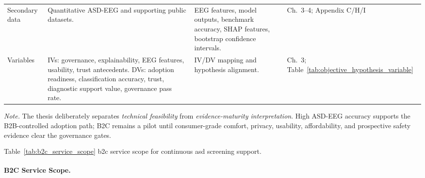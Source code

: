 {\begin{xltabular}{\textwidth}{@{} >{\raggedright\arraybackslash}p{2.0cm} p{6.1cm} p{4.4cm} >{\raggedright\arraybackslash}p{2.0cm} @{}}
\addlinespace
Secondary data & Quantitative ASD-EEG and supporting public datasets. & EEG features, model outputs, benchmark accuracy, SHAP features, bootstrap confidence intervals. & Ch.~3--4; Appendix C/H/I \\
\addlinespace
Variables & IVs: governance, explainability, EEG features, usability, trust antecedents. DVs: adoption readiness, classification accuracy, trust, diagnostic support value, governance pass rate. & IV/DV mapping and hypothesis alignment. & Ch.~3; Table~\ref{tab:objective_hypothesis_variable} \\
\end{xltabular}}
\vspace{0.5em}
\noindent\textit{Note.} The thesis deliberately separates \emph{technical feasibility} from \emph{evidence-maturity interpretation}. High ASD-EEG accuracy supports the B2B-controlled adoption path; B2C remains a pilot until consumer-grade comfort, privacy, usability, affordability, and prospective safety evidence clear the governance gates.

\noindent Table~\ref{tab:b2c_service_scope} b2c service scope for continuous asd screening support.

\paragraph{B2C Service Scope.}




